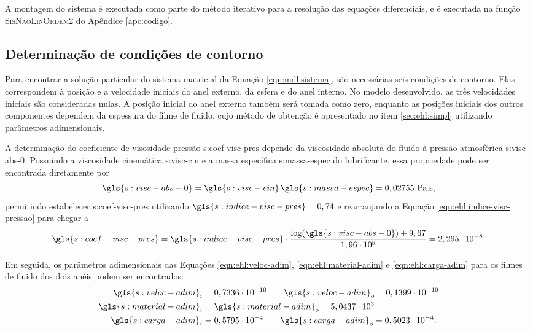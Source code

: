 \documentclass[12pt,oneside,english,brazil,lmodern,siglas,simbolos,cite=num]{ucsmonograph}
\begin{document}
	A montagem do sistema é executada como parte do método iterativo para a resolução das equações diferenciais, e é executada na função \textsc{SisNaoLinOrdem2} do Apêndice \ref{apc:codigo}.
		
	\subsection{Determinação de condições de contorno}
	Para encontrar a solução particular do sistema matricial da Equação \ref{eqn:mdl:sistema}, são necessárias seis condições de contorno.
	Elas correspondem à posição e a velocidade iniciais do anel externo, da esfera e do anel interno.
	No modelo desenvolvido, as três velocidades iniciais são consideradas nulas.
	A posição inicial do anel externo também será tomada como zero, enquanto as posições iniciais dos outros componentes dependem da espessura do filme de fluido, cujo método de obtenção é apresentado no item \ref{sec:ehl:simpl} utilizando parâmetros adimensionais.
	
	A determinação do coeficiente de visosidade-pressão \gls{s:coef-visc-pres} depende da viscosidade absoluta do fluido à pressão atmosférica \gls{s:visc-abs-0}.
	Possuindo a viscosidade cinemática \gls{s:visc-cin} e a massa específica \gls{s:massa-espec} do lubrificante, essa propriedade pode ser encontrada diretamente por \cite{roelands:1966}
	\begin{equation}
		\gls{s:visc-abs-0} = \gls{s:visc-cin}\,\gls{s:massa-espec} =
		0,02755\ \text{Pa.s},
	\end{equation}
	permitindo estabelecer \gls{s:coef-visc-pres} utilizando $\gls{s:indice-visc-pres} = 0,74$ e rearranjando a Equação \ref{eqn:ehl:indice-visc-pressao} para chegar a
	\begin{equation}
		\gls{s:coef-visc-pres} = \gls{s:indice-visc-pres}\cdot
		\frac{\log(\gls{s:visc-abs-0})+9,67}{1,96\cdot 10^8} =
		2,295\cdot 10^{-8}.
	\end{equation}
	
	Em seguida, os parâmetros adimensionais das Equações \ref{eqn:ehl:veloc-adim}, \ref{eqn:ehl:material-adim} e \ref{eqn:ehl:carga-adim} para os filmes de fluido dos dois anéis podem ser encontrados:
	\begin{align*}
		\gls{s:veloc-adim}_i &= 0,7336\cdot 10^{-10} \qquad
		\gls{s:veloc-adim}_o = 0,1399\cdot 10^{-10}\\
		\gls{s:material-adim}_i &= \gls{s:material-adim}_o =
		5,0437\cdot 10^3\\
		\gls{s:carga-adim}_i &= 0,5795\cdot 10^{-4} \qquad
		\gls{s:carga-adim}_o = 0,5023\cdot 10^{-4}.
	\end{align*}
	
\end{document}
